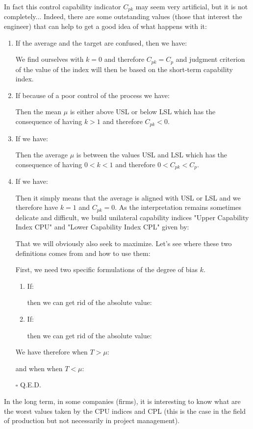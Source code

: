 	In fact this control capability indicator $C_{pk}$ may seem very artificial, but it is not completely... Indeed, there are some outstanding values (those that interest the engineer) that can help to get a good idea of what happens with it:
	\begin{enumerate}
		\item If the average and the target are confused, then we have:
			
			We find ourselves with $k=0$ and therefore $C_{pk}=C_p$ and judgment criterion of the value of the index will then be based on the short-term capability index.
			\item If because of a poor control of the process we have:
			
			Then the mean $\mu$ is either above USL or below LSL which has the consequence of having $k>1$ and therefore $C_{pk}<0$.	
			\item If we have:
			
			Then the average $\mu$ is between the values USL and LSL which has the consequence of having $0<k<1$ and therefore $0<C_{pk}<C_p$.	
			 \item If we have:
			 
			Then it simply means that the average is aligned with USL or LSL and we therefore have $k=1$ and $C_{pk}=0$.
			As the interpretation remains sometimes delicate and difficult, we build unilateral capability indices "Upper Capability Index CPU" and "Lower Capability Index CPL" given by:
			
			That we will obviously also seek to maximize. Let's see where these two definitions comes from and how to use them:
			\begin{dem}
			First, we need two specific formulations of the degree of bias $k$.
			\begin{enumerate}
				\item If:
				
				then we can get rid of the absolute value:
				
				\item If:
				
				then we can get rid of the absolute value:
				
			\end{enumerate}
	We have therefore when $T>\mu$:
		
		and when when $T<\mu$:
		
		\begin{flushright}
			$\square$  Q.E.D.
		\end{flushright}
		\end{dem}
	\end{enumerate}
		In the long term, in some companies (firms), it is interesting to know what are the worst values taken by the CPU indices and CPL (this is the case in the field of production but not necessarily in project management).
		
